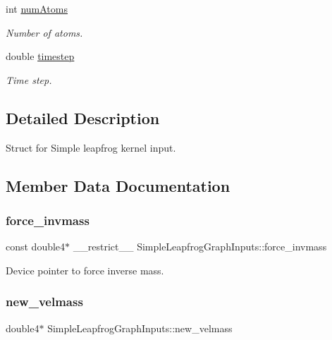 \begin{DoxyCompactItemize}
int \hyperlink{structSimpleLeapfrogGraphInputs_af774c2d3b4033330bb43cbbe3398059f}{num\+Atoms}
\begin{DoxyCompactList}\small\item\em Number of atoms. \end{DoxyCompactList}\item 
double \hyperlink{structSimpleLeapfrogGraphInputs_a197aa8d9f5695cda2406de1aff9b4e3b}{timestep}
\begin{DoxyCompactList}\small\item\em Time step. \end{DoxyCompactList}\end{DoxyCompactItemize}


\subsection{Detailed Description}
Struct for Simple leapfrog kernel input. 

\subsection{Member Data Documentation}
\hypertarget{structSimpleLeapfrogGraphInputs_a0f2c8a7955eede32a5ae9be6fcf9c894}{}\label{structSimpleLeapfrogGraphInputs_a0f2c8a7955eede32a5ae9be6fcf9c894} 
\subsubsection{\texorpdfstring{force\+\_\+invmass}{force\_invmass}}
{\footnotesize\ttfamily const double4$\ast$ \+\_\+\+\_\+restrict\+\_\+\+\_\+ Simple\+Leapfrog\+Graph\+Inputs\+::force\+\_\+invmass}



Device pointer to force inverse mass. 

\hypertarget{structSimpleLeapfrogGraphInputs_aaacb07a926ff1a46ac5c8d0edc21d2af}{}\label{structSimpleLeapfrogGraphInputs_aaacb07a926ff1a46ac5c8d0edc21d2af} 
\subsubsection{\texorpdfstring{new\+\_\+velmass}{new\_velmass}}
{\footnotesize\ttfamily double4$\ast$ Simple\+Leapfrog\+Graph\+Inputs\+::new\+\_\+velmass}



